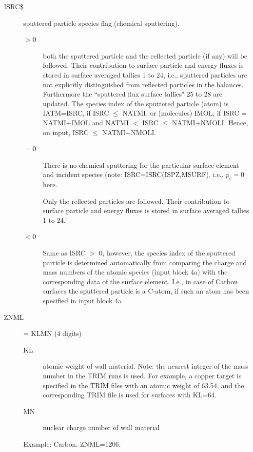 \begin{description}
  \item[ISRC\$] sputtered particle species flag (chemical sputtering).

        \begin{description}
          \item[$> 0$] both the sputtered particle and the reflected particle (if any)
                will be followed.
                Their contribution to surface particle and energy fluxes is stored in surface
                averaged tallies 1 to 24, i.e., sputtered particles are not explicitly
                distinguished from reflected particles in the balances.
                Furthermore the ``sputtered flux surface tallies" 25 to 28 are updated.
                The species index of the sputtered particle (atom) is IATM=ISRC, if ISRC $\le$
                NATMI, or (molecules) IMOL, if ISRC = NATMI+IMOL and NATMI $<$ ISRC $\le$
                NATMI+NMOLI.
                Hence, on input, ISRC $\le$ NATMI+NMOLI.
          \item[$= 0$] There is no chemical sputtering for the particular surface element
                and incident species (note: ISRC=ISRC(ISPZ,MSURF), i.e., $p_c = 0$ here.

                Only the reflected particles are followed.
                Their contribution to surface particle and energy fluxes is stored in surface
                averaged tallies 1 to 24.
          \item[$< 0$] Same as ISRC $>$ 0, however, the species index of the sputtered
                particle is determined automatically from comparing the charge and mass numbers
                of the atomic species (input block 4a) with the corresponding data of the
                surface element.
                I.e., in case of Carbon surfaces the sputtered particle is a C-atom, if such an
                atom has been specified in input block 4a
        \end{description}

  \item[ZNML] = KLMN (4 digits)
        \begin{description}
          \item[KL] atomic weight of
                wall material.
                Note: the nearest integer of the mass number in the TRIM runs is used.
                For example, a copper target is specified in the TRIM files with an atomic
                weight of 63.54, and the corresponding TRIM file is used for surfaces with
                KL=64.
          \item[MN] nuclear charge number of wall material
        \end{description}
        Example:
        Carbon: ZNML=1206.


\end{description}
